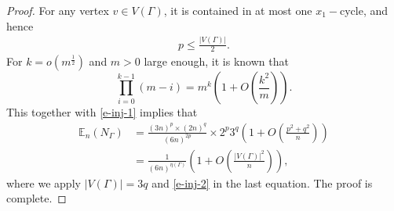 \documentclass{amsart}
\theoremstyle{plain}
\theoremstyle{definition}
\theoremstyle{remark}
\begin{document}
\begin{proof}
    For any vertex $v\in V(\Gamma)$, it is contained in at most one $x_1-$cycle, and hence
    \begin{align}\label{e-inj-2}
        p\leq \frac{|V(\Gamma)|}{2}.
    \end{align}
    For $k=o\left(m^\frac{1}{2}\right)$ and $m>0$ large enough, it is known that
    $$\prod\limits_{i=0}^{k-1}(m-i)=m^k\left(1+O\left(\frac{k^2}{m}\right)\right).$$
    This together with \eqref{e-inj-1} implies that
    \begin{align*}
        \mathbb{E}_n(N_\Gamma)&=\frac{(3n)^p\times(2n)^q}{(6n)^{2p}}\times 2^p3^q\left(1+O\left(\frac{p^2+q^2}{n}\right)\right)\\
        &=\frac{1}{(6n)^{\eta(\Gamma)}}\left(1+O\left(\frac{|V(\Gamma)|^2}{n}\right)\right),
    \end{align*}
    where we apply $|V(\Gamma)|=3q$ and \eqref{e-inj-2} in the last equation. The proof is complete.
\end{proof}
\end{document}
